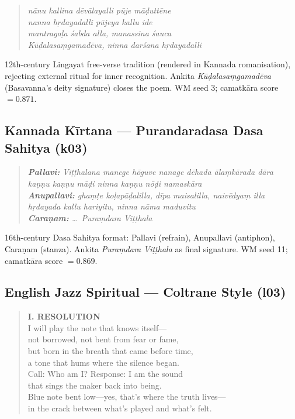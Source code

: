\documentclass[journal,onecolumn,11pt]{IEEEtran}
\begin{document}
\begin{quote}
\small\itshape
nānu kallina dēvālayalli pūje māḍuttēne \\
nanna hṛdayadalli pūjeya kallu ide \\
mantragaḷa śabda alla, manassina śauca \\
Kūḍalasaṃgamadēva, ninna darśana hṛdayadalli
\end{quote}

12th-century Lingayat free-verse tradition (rendered in Kannada romanisation),
rejecting external ritual for inner recognition.
Ankita \emph{Kūḍalasaṃgamadēva} (Basavanna's deity signature) closes the poem.
WM seed 3; camatkāra score $= 0.871$.

\subsection{Kannada Kīrtana --- Purandaradasa Dasa Sahitya (k03)}\label{sec:k03}

\begin{quote}
\small\itshape
\textbf{Pallavi:} Viṭṭhalana manege hōguve nanage dēhada ālaṃkārada dāra \\
kaṇṇu kaṇṇu māḍi ninna kaṇṇu nōḍi namaskāra \\[2pt]
\textbf{Anupallavi:} ghaṃṭe koḷapāḍalilla, dīpa maisalilla, naivēdyaṃ illa \\
hṛdayada kallu hariyitu, ninna nāma maduvitu \\[2pt]
\textbf{Caraṇam:} \ldots\ Puraṃdara Viṭṭhala
\end{quote}

16th-century Dasa Sahitya format: Pallavi (refrain), Anupallavi (antiphon),
Caraṇam (stanza). Ankita \emph{Puraṃdara Viṭṭhala} as final signature.
WM seed 11; camatkāra score $= 0.869$.

\subsection{English Jazz Spiritual — Coltrane Style (l03)}\label{sec:l03}

\begin{quote}
\textrm{\small
\textbf{I. RESOLUTION}\\
I will play the note that knows itself—\\
not borrowed, not bent from fear or fame,\\
but born in the breath that came before time,\\
a tone that hums where the silence began.\\
Call: Who am I? \quad Response: I am the sound\\
that sings the maker back into being.\\
Blue note bent low—yes, that's where the truth lives—\\
in the crack between what's played and what's felt.
}
\end{quote}
\end{document}
